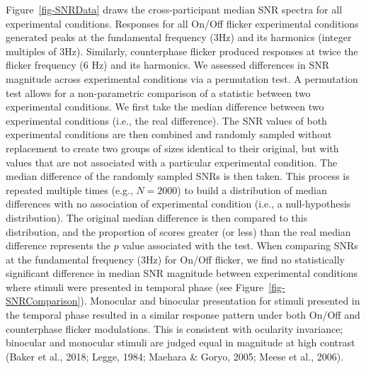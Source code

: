 \documentclass[
  12pt,
]{article}
\begin{document}
Figure~\ref{fig-SNRData} draws the cross-participant median SNR spectra
for all experimental conditions. Responses for all On/Off flicker
experimental conditions generated peaks at the fundamental frequency
(3Hz) and its harmonics (integer multiples of 3Hz). Similarly,
counterphase flicker produced responses at twice the flicker frequency
(6 Hz) and its harmonics. We assessed differences in SNR magnitude
across experimental conditions via a permutation test. A permutation
test allows for a non-parametric comparison of a statistic between two
experimental conditions. We first take the median difference between two
experimental conditions (i.e., the real difference). The SNR values of
both experimental conditions are then combined and randomly sampled
without replacement to create two groups of sizes identical to their
original, but with values that are not associated with a particular
experimental condition. The median difference of the randomly sampled
SNRs is then taken. This process is repeated multiple times (e.g.,
\(N = 2000\)) to build a distribution of median differences with no
association of experimental condition (i.e., a null-hypothesis
distribution). The original median difference is then compared to this
distribution, and the proportion of scores greater (or less) than the
real median difference represents the \(p\) value associated with the
test. When comparing SNRs at the fundamental frequency (3Hz) for On/Off
flicker, we find no statistically significant difference in median SNR
magnitude between experimental conditions where stimuli were presented
in temporal phase (see Figure~\ref{fig-SNRComparison}). Monocular and
binocular presentation for stimuli presented in the temporal phase
resulted in a similar response pattern under both On/Off and
counterphase flicker modulations. This is consistent with ocularity
invariance; binocular and monocular stimuli are judged equal in
magnitude at high contrast (Baker et al., 2018; Legge, 1984; Maehara \&
Goryo, 2005; Meese et al., 2006).
\end{document}
